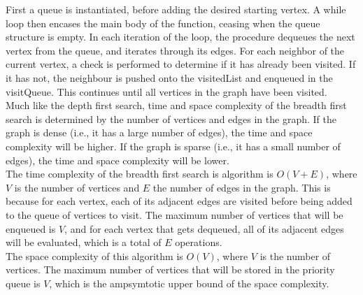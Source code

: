 \documentclass[a4paper]{article}
\begin{document}

First a queue is instantiated, before adding the desired starting vertex.
A while loop then encases the main body of the function, 
ceasing when the queue structure is empty.
In each iteration of the loop, the procedure dequeues the next vertex from the queue,
and iterates through its edges. 
For each neighbor of the current vertex,
a check is performed to determine if it has already been visited.
If it has not, the neighbour is pushed onto the visitedList and enqueued in the visitQueue.
This continues until all vertices in the graph have been visited. \\



Much like the depth first search, time and space complexity of the breadth first search is determined by the number of vertices and edges in the graph.
If the graph is dense (i.e., it has a large number of edges), the time and space complexity will be higher. 
If the graph is sparse (i.e., it has a small number of edges), the time and space complexity will be lower. \\

The time complexity of the breadth first search is algorithm is $O(V + E)$, where $V$ is the number of vertices and $E$ the number of edges in the graph.
This is because for each vertex,  each of its adjacent edges are visited before being added to the  queue of vertices to visit.
The maximum number of vertices that will be enqueued is $V$, and for each vertex that gets dequeued,
all of its adjacent edges will be evaluated, which is a total of $E$ operations. \\

The space complexity of this algorithm is $O(V)$, where $V$ is the number of vertices.
The maximum number of vertices that will be stored in the priority queue is $V$, which is the ampsymtotic upper bound of the space complexity. \\
\end{document}
